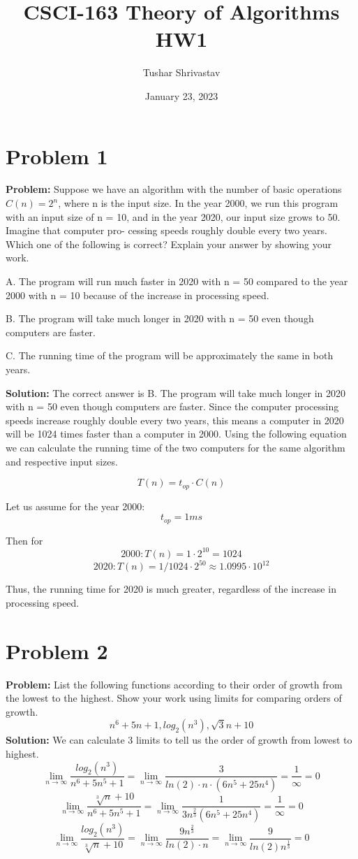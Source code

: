 \documentclass{article}
\title{CSCI-163 Theory of Algorithms HW1}
\author{Tushar Shrivastav}
\date{January 23, 2023}
\begin{document}
\maketitle

\section{Problem 1}
\textbf{Problem:} 
Suppose we have an algorithm with the number of basic operations $C(n) = 2^n$,
where n is the input size. In the year 2000, we run this program with an input size of
n = 10, and in the year 2020, our input size grows to 50. Imagine that computer pro-
cessing speeds roughly double every two years. Which one of the following is correct?
Explain your answer by showing your work.

A. The program will run much faster in 2020 with n = 50 compared to the year 2000
with n = 10 because of the increase in processing speed.

B. The program will take much longer in 2020 with n = 50 even though computers
are faster.

C. The running time of the program will be approximately the same in both years.

\textbf{Solution:}
The correct answer is B. The program will take much longer in 2020 with n = 50 even though computers are faster. Since the computer processing speeds increase roughly double every two years, this means a computer in 2020 will be 1024 times faster than a computer in 2000. Using the following equation we can calculate the running time of the two computers for the same algorithm and respective input sizes.

\begin{equation}
    T(n) = t_{op} \cdot C(n)
\end{equation}

Let us assume for the year 2000: \[t_{op} = 1 ms\] 

Then for  \[2000: T(n) = 1 \cdot 2^{10} = 1024\] \[2020: T(n) = 1/1024 \cdot 2^{50} \approx 1.0995 \cdot 10^{12}\]

Thus, the running time for 2020 is much greater, regardless of the increase in processing speed.

\section{Problem 2}
\textbf{Problem:} List the following functions according to their order of growth from the lowest
to the highest. Show your work using limits for comparing orders of growth.
\[n^6 +5n +1, log_2(n^3), \sqrt{3}{n} + 10\]
\textbf{Solution: }
We can calculate 3 limits to tell us the order of growth from lowest to highest.
\[ \lim_{n\to\infty} \frac{log_2(n^3)}{n^6+5n^5+1} = \lim_{n\to\infty} \frac{3}{ln(2)\cdot n \cdot (6n^5 +25n^4)} = \frac{1}{\infty} = 0\]
\[ \lim_{n\to\infty} \frac{\sqrt[3]{n}+10}{n^6+5n^5+1} = \lim_{n\to\infty} \frac{1}{3n^{\frac{2}{3}}(6n^5 +25n^4)} = \frac{1}{\infty} = 0 \]
\[ \lim_{n\to\infty} \frac{log_2(n^3)}{\sqrt[3]{n}+10} = \lim_{n\to\infty} \frac{9n^{\frac{2}{3}} }{ln(2)\cdot n} = \lim_{n\to\infty} {\frac{9}{ln(2)n^{\frac{1}{3}}}} = 0\]
\end{document}
